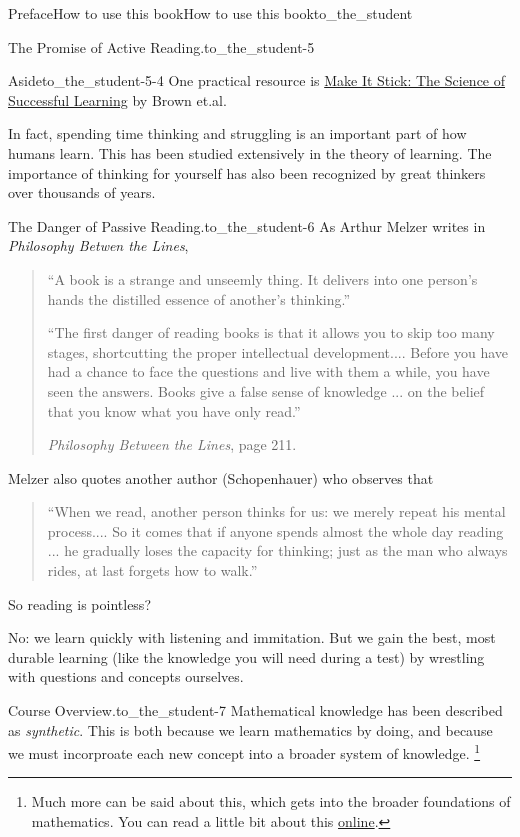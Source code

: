 \documentclass[oneside,10pt,]{tufte-book}
\numberwithin{equation}{chapter}
\begin{document}
\begin{preface}{Preface}{How to use this book}{}{How to use this book}{}{}{to_the_student}
\begin{paragraphs}{The Promise of Active Reading.}{to_the_student-5}
\begin{aside}{Aside}{}{to_the_student-5-4}%
One practical resource is \href{https://www.amazon.com/Make-Stick-Science-Successful-Learning/dp/0674729013}{Make It Stick: The Science of Successful Learning}\footnotemark{} by Brown et.al.%
\end{aside}
%
In fact, spending time thinking and struggling is an important part of how humans learn.  This has been studied extensively in the theory of learning. The importance of thinking for yourself has also been recognized by great thinkers over thousands of years.%
\end{paragraphs}%
\begin{paragraphs}{The Danger of Passive Reading.}{to_the_student-6}%
As Arthur Melzer writes in \emph{Philosophy Betwen the Lines},%
\begin{quote}%
``A book is a strange and unseemly thing.  It delivers into one person's hands the distilled essence of another's thinking.''%
\par
``The first danger of reading books is that it allows you to skip too many stages, shortcutting the proper intellectual development.... Before you have had a chance to face the questions and live with them a while, you have seen the answers. Books give a false sense of knowledge ... on the belief that you know what you have only read.''%
\par
\emph{Philosophy Between the Lines}, page 211.%
\end{quote}
Melzer also quotes another author (Schopenhauer) who observes that%
\begin{quote}%
``When we read, another person thinks for us: we merely repeat his mental process.... So it comes that if anyone spends almost the whole day reading ... he gradually loses the capacity for thinking; just as the man who always rides, at last forgets how to walk.''%
\end{quote}
So reading is pointless?%
\par
No: we learn quickly with listening and immitation. But we gain the best, most durable learning (like the knowledge you will need during a test) by wrestling with questions and concepts ourselves.%
\end{paragraphs}%
\begin{paragraphs}{Course Overview.}{to_the_student-7}%
Mathematical knowledge has been described as \emph{synthetic}. This is both because we learn mathematics by doing, and because we must incorproate each new concept into a broader system of knowledge. \footnote{Much more can be said about this, which gets into the broader foundations of mathematics.  You can read a little bit about this \href{https://en.wikipedia.org/wiki/Analytic\%E2\%80\%93synthetic_distinction}{online}.\label{to_the_student-7-2-2}}%

\end{paragraphs}
\end{preface}
\end{document}
